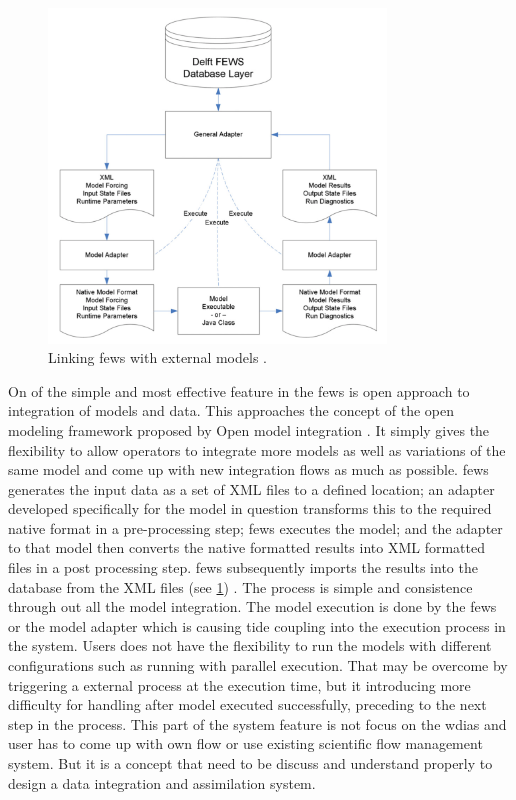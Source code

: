 \begin{figure}[htp]
    \centering
    \includegraphics[width=0.8\textwidth]{lit/fews/Linking-Delft-FEWS-with-external-models-The-fi-gure-shows-the-fl-ow-of-data-through-XML_W640.png}
    \caption[Linking \acrshort{fews} with external models]{Linking \acrshort{fews} with external models \cite{Werner2013TheSystem}.}
    \label{fi:fews_general_adapter}
\end{figure}
On of the simple and most effective feature in the \acrshort{fews} is open approach to integration of models and data. This approaches the concept of the open modeling framework proposed by Open model integration \cite{Kokkonen2003InterfacingXML}. It simply gives the flexibility to allow operators to integrate more models as well as variations of the same model and come up with new integration flows as much as possible.
\acrshort{fews} generates the input data as a set of XML files to a defined location; an adapter developed specifically for the model in question transforms this to the required native format in a pre-processing step; \acrshort{fews} executes the model; and the adapter to that model then converts the native formatted results into XML formatted files in a post processing step. \acrshort{fews} subsequently imports the results into the database from the XML files (see \cref{fi:fews_general_adapter}) \cite{Werner2013TheSystem}. The process is simple and consistence through out all the model integration. The model execution is done by the \acrshort{fews} or the model adapter which is causing tide coupling into the execution process in the system. Users does not have the flexibility to run the models with different configurations such as running with parallel execution. That may be overcome by triggering a external process at the execution time, but it introducing more difficulty for handling after model executed successfully, preceding to the next step in the process. This part of the system feature is not focus on the \acrshort{wdias} and user has to come up with own flow or use existing scientific flow management system. But it is a concept that need to be discuss and understand properly to design a data integration and assimilation system.

